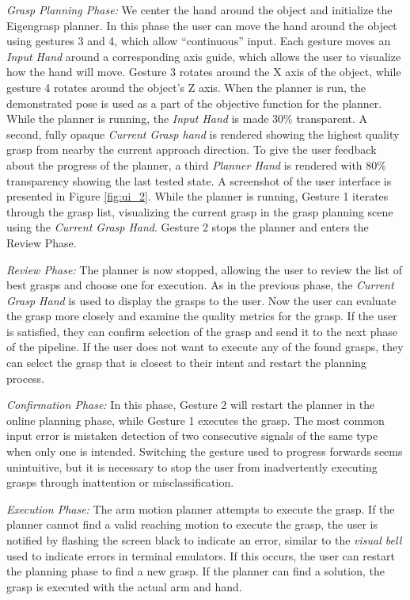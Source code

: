 \emph{Grasp Planning Phase:} We center the hand around the object and initialize the Eigengrasp planner. In this phase the user can move the hand around the object using gestures 3 and 4, which allow ``continuous'' input. Each gesture moves an \emph{Input Hand} around a corresponding axis guide, which allows the user to visualize how the hand will move. Gesture 3 rotates around the X axis of the object, while gesture 4 rotates around the object's Z axis. When the planner is run, the demonstrated pose is used as a part of the objective function for the planner. While the planner is running, the \emph{Input Hand} is made 30\% transparent. A second, fully opaque \emph{Current Grasp hand} is rendered showing the highest quality grasp from nearby the current approach direction. To give the user feedback about the progress of the planner, a third \emph{Planner Hand} is rendered with 80\% transparency showing the last tested state. A screenshot of the user interface is presented in Figure \ref{fig:ui_2}. While the planner is running,  Gesture 1 iterates through the grasp list, visualizing the current grasp in the grasp planning scene using the \emph{Current Grasp Hand}. Gesture 2 stops the planner and enters the Review Phase.

\emph{Review Phase:} The planner is now stopped, allowing the user to review the list of best grasps and choose one for execution. As in the previous phase, the \emph{Current Grasp Hand} is used to display the grasps to the user. Now the user can evaluate the grasp more closely and examine the quality metrics for the grasp. If the user is satisfied, they can confirm selection of the grasp and send it to the next phase of the pipeline. If the user does not want to execute any of the found grasps, they can select the grasp that is closest to their intent and restart the planning process.

\emph{Confirmation Phase:} In this phase, Gesture 2 will restart the planner in the online planning phase, while Gesture 1 executes the grasp. The most common input error is mistaken detection of two consecutive signals of the same type when only one is intended. Switching the gesture used to progress forwards seems unintuitive, but it is necessary to stop the user from inadvertently executing grasps through inattention or misclassification. 

\emph{Execution Phase:} The arm motion planner attempts to execute the grasp. If the planner cannot find a valid reaching motion to execute the grasp, the user is notified by flashing the screen black to indicate an error, similar to the \emph{visual bell} used to indicate errors in terminal emulators. If this occurs, the user can restart the planning phase to find a new grasp. If the planner can find a solution, the grasp is executed with the actual arm and hand.

